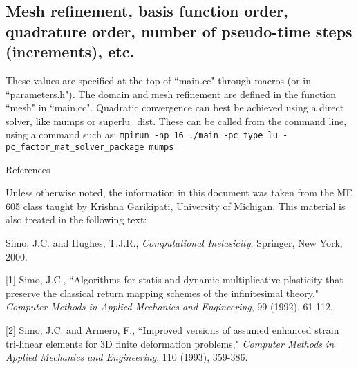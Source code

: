 \documentclass[10pt]{article}
\begin{document}
\subsection{Mesh refinement, basis function order, quadrature order, number of pseudo-time steps (increments), etc.}
These values are specified at the top of ``main.cc" through macros (or in ``parameters.h"). The domain and mesh refinement are defined in the function ``mesh" in ``main.cc". Quadratic convergence can best be achieved using a direct solver, like mumps or superlu\_dist. These can be called from the command line, using a command such as:  \texttt{mpirun -np 16 ./main -pc\_type lu -pc\_factor\_mat\_solver\_package mumps}


\pagebreak

\centerline{\Large{References}}

Unless otherwise noted, the information in this document was taken from the ME 605 class taught by Krishna Garikipati, University of Michigan. This material is also treated in the following text:

Simo, J.C. and Hughes, T.J.R., \textit{Computational Inelasicity}, Springer, New York, 2000.

[1] Simo, J.C., ``Algorithms for statis and dynamic multiplicative plasticity that preserve the classical return mapping schemes of the infinitesimal theory," \textit{Computer Methods in Applied Mechanics and Engineering}, 99 (1992), 61-112.

[2]  Simo, J.C. and Armero, F., ``Improved versions of assumed enhanced strain tri-linear elements for 3D finite deformation problems,"  \textit{Computer Methods in Applied Mechanics and Engineering}, 110 (1993), 359-386.
\end{document}
